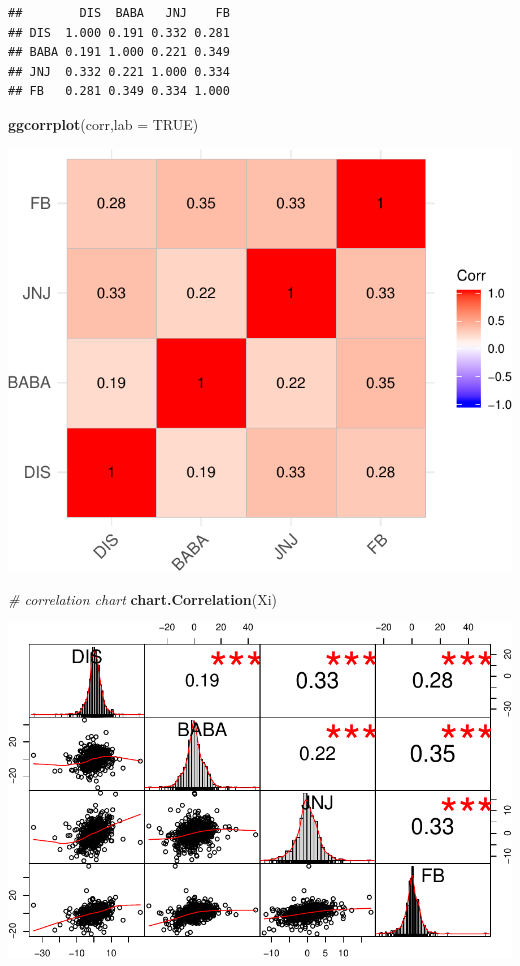 \documentclass[]{article}
\newenvironment{Shaded}{\begin{snugshade}}{\end{snugshade}}
\newcommand{\KeywordTok}[1]{\textcolor[rgb]{0.13,0.29,0.53}{\textbf{#1}}}
\newcommand{\DataTypeTok}[1]{\textcolor[rgb]{0.13,0.29,0.53}{#1}}
\newcommand{\CommentTok}[1]{\textcolor[rgb]{0.56,0.35,0.01}{\textit{#1}}}
\newcommand{\OtherTok}[1]{\textcolor[rgb]{0.56,0.35,0.01}{#1}}
\newcommand{\NormalTok}[1]{#1}
\begin{document}
\begin{verbatim}
##        DIS  BABA   JNJ    FB
## DIS  1.000 0.191 0.332 0.281
## BABA 0.191 1.000 0.221 0.349
## JNJ  0.332 0.221 1.000 0.334
## FB   0.281 0.349 0.334 1.000
\end{verbatim}

\begin{Shaded}
\begin{Highlighting}[]
\KeywordTok{ggcorrplot}\NormalTok{(corr,}\DataTypeTok{lab =} \OtherTok{TRUE}\NormalTok{)}
\end{Highlighting}
\end{Shaded}

\includegraphics{Markowitz_Research_Me_files/figure-latex/unnamed-chunk-12-1.pdf}

\begin{Shaded}
\begin{Highlighting}[]
\CommentTok{# correlation chart}
\KeywordTok{chart.Correlation}\NormalTok{(Xi)}
\end{Highlighting}
\end{Shaded}

\includegraphics{Markowitz_Research_Me_files/figure-latex/unnamed-chunk-12-2.pdf}
\end{document}
